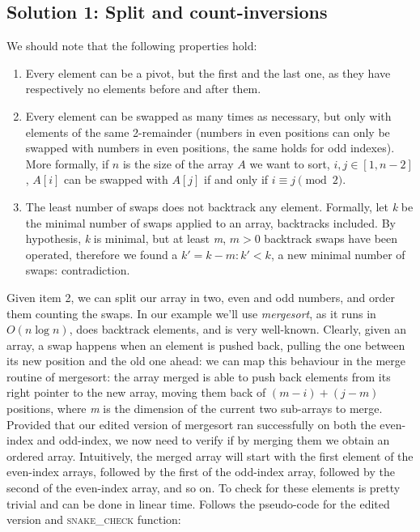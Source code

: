 \documentclass{article}
\begin{document}
\subsection{Solution 1: Split and count-inversions}

We should note that the following properties hold:
\begin{enumerate}
    \item Every element can be a pivot, but the first and the last one, as they
    have respectively no elements before and after them.
    \item Every element can be swapped as many times as necessary, but only with
    elements of the same 2-remainder (numbers in even positions can only be
    swapped with numbers in even positions, the same holds for odd indexes).
    More formally, if $n$ is the size of the array $A$ we want to sort,
    $i,j \in [1, n - 2]$, $A[i]$ can be swapped with $A[j]$ if and only if $i \equiv j \pmod{2}$.
    \item The least number of swaps does not backtrack any element.
    Formally, let \emph{k} be the minimal number of swaps applied to an array,
    backtracks included. By hypothesis, \emph{k} is minimal, but at least \emph{m},
    $m > 0$ backtrack swaps have been operated, therefore we found a
    $k' = k - m: k' < k$, a new minimal number of swaps: contradiction.
\end{enumerate}

Given item 2, we can split our array in two, even and odd numbers, and order
them counting the swaps.
In our example we'll use \emph{mergesort}, as it runs in $O(n\log n)$, does
backtrack elements, and is very well-known.
Clearly, given an array, a swap happens when an element is pushed back, pulling
the one between its new position and the old one ahead: we can map this behaviour
in the merge routine of mergesort: the array merged is able to push back elements
from its right pointer to the new array, moving them back of $(m - i) + (j - m)$ positions,
where \emph{m} is the dimension of the current two sub-arrays to merge.
Provided that our edited version of mergesort ran successfully on both the
even-index and odd-index, we now need to verify if by merging them we obtain an
ordered array.
Intuitively, the merged array will start with the first element of the even-index
arrays, followed by the first of the odd-index array, followed by the second of
the even-index array, and so on.
To check for these elements is pretty trivial and can be done in linear time.
Follows the pseudo-code for the edited version and \textsc{snake\_check} function:
\end{document}

